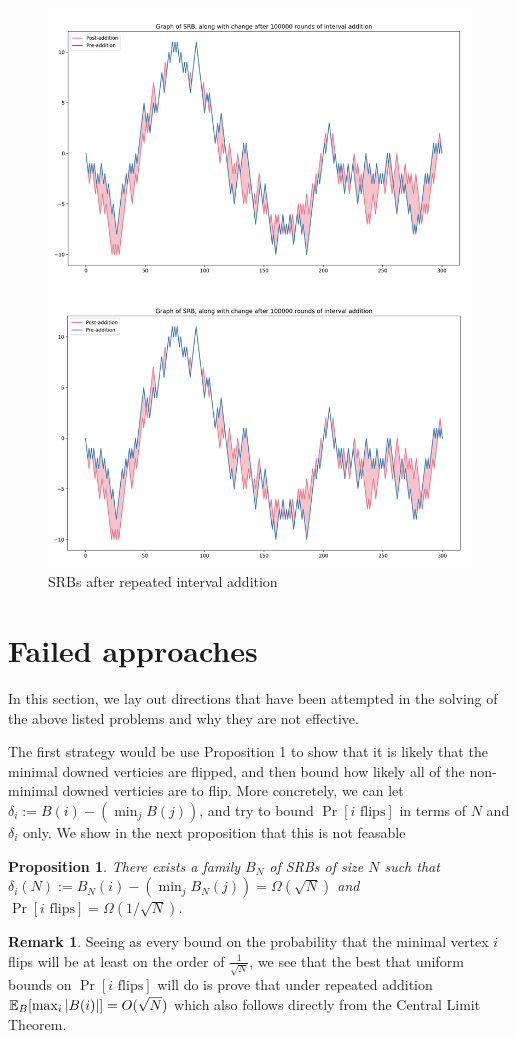 \documentclass{article}
\newtheorem{proposition}{Proposition}
\theoremstyle{definition}
\newtheorem{remark}{Remark}
\begin{document}
\begin{figure}[h!]
\caption{SRBs after repeated interval addition}
\centering
\includegraphics[width=.7\textwidth]{Figure_7}
\end{figure}

\section{Failed approaches}

In this section, we lay out directions that have been attempted in the solving of the above listed problems and why they are not effective.

The first strategy would be use Proposition 1 to show that it is likely that the minimal downed verticies are flipped, and then bound how likely all of the non-minimal downed verticies are to flip. More concretely, we can let $\delta_i:=B(i)-(\min_jB(j))$, and try to bound $\Pr[i \,\,\mathrm{flips}]$ in terms of $N$ and $\delta_i$ only. We show in the next proposition that this is not feasable

\begin{proposition} There exists a family $B_N$ of SRBs of size $N$ such that $\delta_i(N):=B_N(i)-(\min_jB_N(j))=\Omega(\sqrt{N})$ and $\Pr[i \,\, \mathrm{flips}]=\Omega(1/\sqrt{N})$.
\end{proposition}

\begin{remark}
Seeing as every bound on the probability that the minimal vertex $i$ flips will be at least on the order of $\frac{1}{\sqrt{N}}$, we see that the best that uniform bounds on $\Pr[i \,\, \mathrm{flips}]$ will do is prove that under repeated addition $\mathbb{E}_{B}[\max_i|B(i)|]=O(\sqrt{N})$  which also follows directly from the Central Limit Theorem.
\end{remark}
\end{document}

